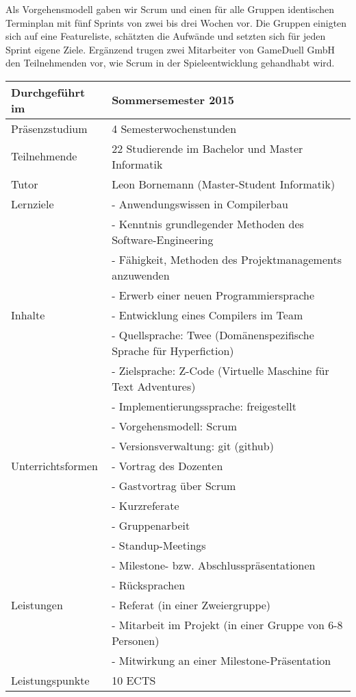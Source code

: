 \documentclass[11pt,ngerman]{article}
\begin{document}
Als Vorgehensmodell gaben wir Scrum und einen für alle Gruppen identischen Terminplan mit fünf Sprints von zwei bis drei Wochen vor. Die Gruppen einigten sich auf eine Featureliste, schätzten die Aufwände und setzten sich für jeden Sprint eigene Ziele. Ergänzend trugen zwei Mitarbeiter von GameDuell GmbH den Teilnehmenden vor, wie Scrum in der Spieleentwicklung gehandhabt wird.
\noindent
\renewcommand{\arraystretch}{1.5}
\begin{longtable}{ l | l }
  \hline			
  Durchgeführt im & Sommersemester 2015 \\
  \hline			
  Präsenzstudium & 4 Semesterwochenstunden\\
  \hline			
  Teilnehmende & 22 Studierende im Bachelor und Master Informatik\\
  \hline			
  Tutor & Leon Bornemann (Master-Student Informatik)\\
  \hline
  Lernziele & - Anwendungswissen in Compilerbau\\[-2mm]
  & - Kenntnis grundlegender Methoden des Software-Engineering\\[-2mm]
  & - Fähigkeit, Methoden des Projektmanagements anzuwenden\\[-2mm]
  & - Erwerb einer neuen Programmiersprache\\
  \hline  
  Inhalte & - Entwicklung eines Compilers im Team\\[-2mm]
  & - Quellsprache: Twee (Domänenspezifische Sprache für Hyperfiction)\\[-2mm]
  & - Zielsprache: Z-Code (Virtuelle Maschine für Text Adventures)\\[-2mm]
  & - Implementierungssprache: freigestellt\\[-2mm]
  & - Vorgehensmodell: Scrum\\[-2mm]
  & - Versionsverwaltung: git (github)\\
  \hline
  Unterrichtsformen & - Vortrag des Dozenten\\[-2mm]
  & - Gastvortrag über Scrum\\[-2mm]
  & - Kurzreferate\\[-2mm]
  & - Gruppenarbeit\\[-2mm]
  & - Standup-Meetings\\[-2mm]
  & - Milestone- bzw. Abschlusspräsentationen\\[-2mm]
  & - Rücksprachen\\
  \hline
  Leistungen & - Referat (in einer Zweiergruppe)\\[-2mm]
  & - Mitarbeit im Projekt (in einer Gruppe von 6-8 Personen) \\[-2mm]
  & - Mitwirkung an einer Milestone-Präsentation\\
  \hline
  Leistungspunkte & 10 ECTS\\
\end{longtable}
\end{document}
